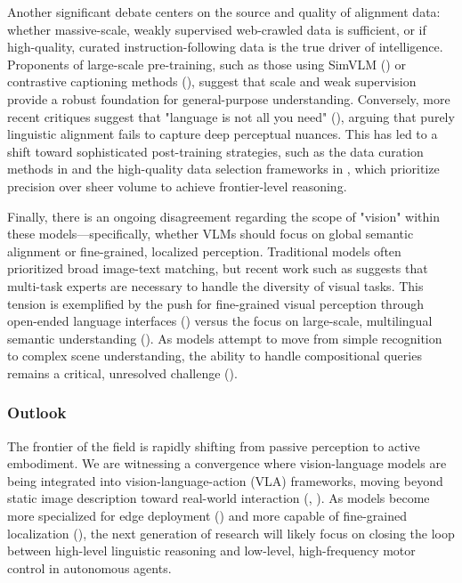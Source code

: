 \documentclass[11pt]{article}
\begin{document}
Another significant debate centers on the source and quality of alignment data: whether massive-scale, weakly supervised web-crawled data is sufficient, or if high-quality, curated instruction-following data is the true driver of intelligence. Proponents of large-scale pre-training, such as those using SimVLM (\citep{2108.10904}) or contrastive captioning methods (\citep{2205.01917}), suggest that scale and weak supervision provide a robust foundation for general-purpose understanding. Conversely, more recent critiques suggest that "language is not all you need" (\citep{2302.14045}), arguing that purely linguistic alignment fails to capture deep perceptual nuances. This has led to a shift toward sophisticated post-training strategies, such as the data curation methods in \citep{2501.14818} and the high-quality data selection frameworks in \citep{2501.05952}, which prioritize precision over sheer volume to achieve frontier-level reasoning.

Finally, there is an ongoing disagreement regarding the scope of "vision" within these models—specifically, whether VLMs should focus on global semantic alignment or fine-grained, localized perception. Traditional models often prioritized broad image-text matching, but recent work such as \citep{2303.02506} suggests that multi-task experts are necessary to handle the diversity of visual tasks. This tension is exemplified by the push for fine-grained visual perception through open-ended language interfaces (\citep{2503.01342}) versus the focus on large-scale, multilingual semantic understanding (\citep{2209.06794}). As models attempt to move from simple recognition to complex scene understanding, the ability to handle compositional queries remains a critical, unresolved challenge (\citep{2503.23125}).

\subsubsection{Outlook}

The frontier of the field is rapidly shifting from passive perception to active embodiment. We are witnessing a convergence where vision-language models are being integrated into vision-language-action (VLA) frameworks, moving beyond static image description toward real-world interaction (\citep{2505.04769}, \citep{2601.03309}). As models become more specialized for edge deployment (\citep{2502.07855}) and more capable of fine-grained localization (\citep{2502.14786}), the next generation of research will likely focus on closing the loop between high-level linguistic reasoning and low-level, high-frequency motor control in autonomous agents.
\end{document}
